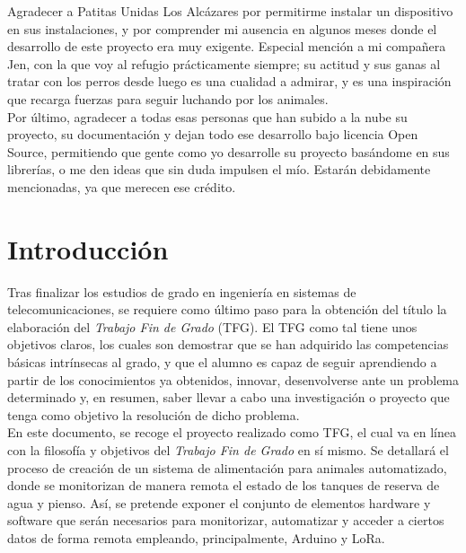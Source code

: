 \documentclass[12pt]{article}
\begin{document}
	\noindent [Patitas]  Agradecer a Patitas Unidas Los Alcázares por permitirme instalar un dispositivo en sus instalaciones, y por comprender mi ausencia en algunos meses donde el desarrollo de este proyecto era muy exigente. Especial mención a mi compañera Jen, con la que voy al refugio prácticamente siempre; su actitud y sus ganas al tratar con los perros desde luego es una cualidad a admirar, y es una inspiración que recarga fuerzas para seguir luchando por los animales.\\
	
	 Por último, agradecer a todas esas personas que han subido a la nube su proyecto, su documentación y dejan todo ese desarrollo bajo licencia Open Source, permitiendo que gente como yo desarrolle su proyecto basándome en sus librerías, o me den ideas que sin duda impulsen el mío. Estarán debidamente mencionadas, ya que merecen ese crédito.\\
	
	\pagebreak
	
	\section[Introducción]{Introducción} %
	
	Tras finalizar los estudios de grado en ingeniería en sistemas de telecomunicaciones, se requiere como último paso para la obtención del título la elaboración del \textit{Trabajo Fin de Grado} (TFG). 
	El TFG como tal tiene unos objetivos claros, los cuales son demostrar que se han adquirido las competencias básicas intrínsecas al grado, y que el alumno es capaz de seguir aprendiendo a partir de los conocimientos ya obtenidos, innovar, desenvolverse ante un problema determinado y, en resumen, saber llevar a cabo una investigación o proyecto que tenga como objetivo la resolución de dicho problema. \\
	
	\noindent En este documento, se recoge el proyecto realizado como TFG,  el cual va en línea con la filosofía y objetivos del \textit{Trabajo Fin de Grado} en sí mismo. Se detallará el proceso de creación de un sistema de alimentación para animales automatizado, donde se monitorizan de manera remota el estado de los tanques de reserva de agua y pienso. Así, se pretende exponer el conjunto de elementos hardware y software que serán necesarios para monitorizar, automatizar y acceder a ciertos datos de forma remota empleando, principalmente, Arduino y LoRa.\\
	
\end{document}
